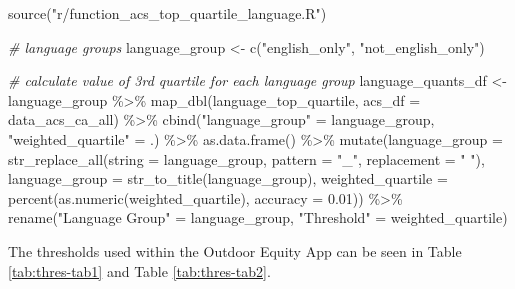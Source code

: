 \documentclass[
  11 pt,
  openany]{book}
\newenvironment{Shaded}{\begin{snugshade}}{\end{snugshade}}
\newcommand{\AttributeTok}[1]{\textcolor[rgb]{0.77,0.63,0.00}{#1}}
\newcommand{\CommentTok}[1]{\textcolor[rgb]{0.56,0.35,0.01}{\textit{#1}}}
\newcommand{\FloatTok}[1]{\textcolor[rgb]{0.00,0.00,0.81}{#1}}
\newcommand{\FunctionTok}[1]{\textcolor[rgb]{0.00,0.00,0.00}{#1}}
\newcommand{\NormalTok}[1]{#1}
\newcommand{\OtherTok}[1]{\textcolor[rgb]{0.56,0.35,0.01}{#1}}
\newcommand{\SpecialCharTok}[1]{\textcolor[rgb]{0.00,0.00,0.00}{#1}}
\newcommand{\StringTok}[1]{\textcolor[rgb]{0.31,0.60,0.02}{#1}}
\begin{document}
\begin{Shaded}
\begin{Highlighting}[]
\FunctionTok{source}\NormalTok{(}\StringTok{"r/function\_acs\_top\_quartile\_language.R"}\NormalTok{)}

\CommentTok{\# language groups}
\NormalTok{language\_group }\OtherTok{\textless{}{-}} \FunctionTok{c}\NormalTok{(}\StringTok{"english\_only"}\NormalTok{, }\StringTok{"not\_english\_only"}\NormalTok{)}

\CommentTok{\# calculate value of 3rd quartile for each language group}
\NormalTok{language\_quants\_df }\OtherTok{\textless{}{-}}
\NormalTok{  language\_group }\SpecialCharTok{\%\textgreater{}\%}
  \FunctionTok{map\_dbl}\NormalTok{(language\_top\_quartile, }\AttributeTok{acs\_df =}\NormalTok{ data\_acs\_ca\_all) }\SpecialCharTok{\%\textgreater{}\%}
  \FunctionTok{cbind}\NormalTok{(}\StringTok{"language\_group"} \OtherTok{=}\NormalTok{ language\_group,}
        \StringTok{"weighted\_quartile"} \OtherTok{=}\NormalTok{ .) }\SpecialCharTok{\%\textgreater{}\%}
  \FunctionTok{as.data.frame}\NormalTok{() }\SpecialCharTok{\%\textgreater{}\%} 
  \FunctionTok{mutate}\NormalTok{(}\AttributeTok{language\_group =} \FunctionTok{str\_replace\_all}\NormalTok{(}\AttributeTok{string =}\NormalTok{ language\_group,}
                                          \AttributeTok{pattern =} \StringTok{"\_"}\NormalTok{,}
                                          \AttributeTok{replacement =} \StringTok{" "}\NormalTok{),}
         \AttributeTok{language\_group =} \FunctionTok{str\_to\_title}\NormalTok{(language\_group),}
         \AttributeTok{weighted\_quartile =} \FunctionTok{percent}\NormalTok{(}\FunctionTok{as.numeric}\NormalTok{(weighted\_quartile), }
                                     \AttributeTok{accuracy =} \FloatTok{0.01}\NormalTok{)) }\SpecialCharTok{\%\textgreater{}\%} 
  \FunctionTok{rename}\NormalTok{(}\StringTok{"Language Group"} \OtherTok{=}\NormalTok{ language\_group,}
         \StringTok{"Threshold"} \OtherTok{=}\NormalTok{ weighted\_quartile)}
\end{Highlighting}
\end{Shaded}

The thresholds used within the Outdoor Equity App can be seen in Table \ref{tab:thres-tab1} and Table \ref{tab:thres-tab2}.
\end{document}
